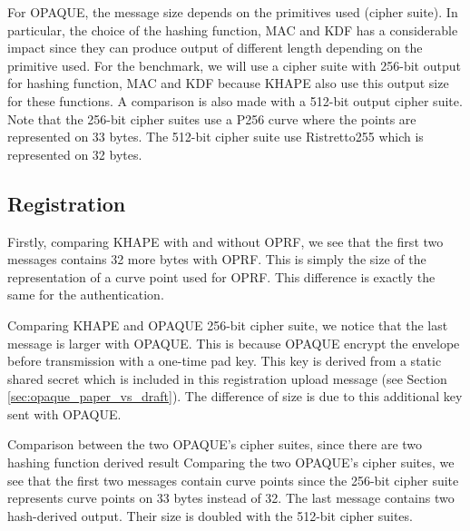 ﻿\documentclass[../report.tex]{subfiles}
\begin{document}
For OPAQUE, the message size depends on the primitives used (cipher suite). In particular, the choice of the hashing function, MAC and KDF has a considerable impact since they can produce output of different length depending on the primitive used.
For the benchmark, we will use a cipher suite with 256-bit output for hashing function, MAC and KDF because KHAPE also use this output size for these functions. A comparison is also made with a 512-bit output cipher suite.
Note that the 256-bit cipher suites use a P256 curve where the points are represented on 33 bytes. The 512-bit cipher suite use Ristretto255 which is represented on 32 bytes.

% 
% 


\pgfplotsset{width=\textwidth-2.4cm}


\subsection*{Registration}
Firstly, comparing KHAPE with and without OPRF, we see that the first two messages contains 32 more bytes with OPRF. This is simply the size of the representation of a curve point used for OPRF. This difference is exactly the same for the authentication.

Comparing KHAPE and OPAQUE 256-bit cipher suite, we notice that the last message is larger with OPAQUE.
This is because OPAQUE encrypt the envelope before transmission with a one-time pad key.
This key is derived from a static shared secret which is included in this registration upload message (see Section \ref{sec:opaque_paper_vs_draft}). The difference of size is due to this additional key sent with OPAQUE.

Comparison between the two OPAQUE's cipher suites, since there are two hashing function derived result
Comparing the two OPAQUE's cipher suites, we see that the first two messages contain curve points since the 256-bit cipher suite represents curve points on 33 bytes instead of 32.
The last message contains two hash-derived output. Their size is doubled with the 512-bit cipher suites.
\end{document}
